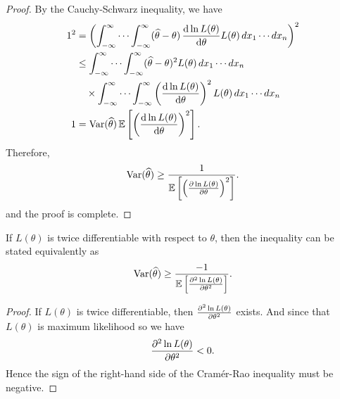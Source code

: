 \begin{proof}
    By the Cauchy-Schwarz inequality, we have
    \begin{align*}
        1^2 &= \left( \int_{-\infty}^{\infty} \cdots \int_{-\infty}^{\infty} (\widehat{\theta} - \theta) \, \odv{\ln L(\theta)}{\theta} L(\theta) \, dx_1 \cdots dx_n \right)^2\\
        &\leq \int_{-\infty}^{\infty} \cdots \int_{-\infty}^{\infty} (\widehat{\theta} - \theta)^2 L(\theta) \, dx_1 \cdots dx_n \\
        &\quad \times \int_{-\infty}^{\infty} \cdots \int_{-\infty}^{\infty} \left( \odv{\ln L(\theta)}{\theta} \right)^2 L(\theta) \, dx_1 \cdots dx_n \\
        1 &= \text{Var}(\widehat{\theta}) \, \mathbb{E} \left[ \left( \odv{\ln L(\theta)}{\theta} \right)^2 \right].
    \end{align*}
    Therefore,
    \[
        \text{Var}(\widehat{\theta}) \geq \frac{1}{\mathbb{E} \left[ \left( \pdv{\ln L(\theta)}{\theta} \right)^2 \right]}.
    \]
    and the proof is complete.
\end{proof}

\begin{corollary}
    If $L(\theta)$ is twice differentiable with respect to $\theta$, then the inequality 
    can be stated equivalently as
    \begin{equation}
        \text{Var}(\widehat{\theta}) \geq \frac{-1}{\mathbb{E} \left[ \pdv[order={2}]{\ln L(\theta)}{\theta} \right]}.
    \end{equation}
\end{corollary}
\begin{proof}
    If $L(\theta)$ is twice differentiable, then $\pdv[order={2}]{\ln L(\theta)}{\theta}$ exists. 
    And since that $L(\theta)$ is maximum likelihood so we have
    \[
        \pdv[order={2}]{\ln L(\theta)}{\theta} < 0.
    \]
    Hence the sign of the right-hand side of the Cramér-Rao inequality must be negative.
\end{proof}

